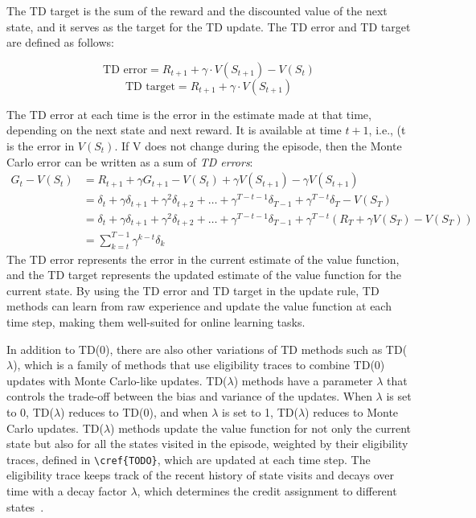 \documentclass[../xlapes02]{subfiles}
\begin{document}
    The TD target is the sum of the reward and the discounted value of the next state, and it serves as the target for the TD update. The TD error and TD target are defined as follows:

    \[ \text{TD error} = R_{t+1} + \gamma \cdot V(S_{t+1}) - V(S_t) \]
    \[ \text{TD target} = R_{t+1} + \gamma \cdot V(S_{t+1}) \]

%
    The TD error at each time is the error in the estimate made at that time, depending on the next state and next reward. It is available at time $t + 1$, i.e., (t is the error in $V(S_t)$. If V does not change during the episode, then the Monte Carlo error can be written as a sum of \emph{TD errors}:
    \begin{equation}
        \begin{split}
            G_t - V(S_t) &= R_{t+1} + \gamma G_{t+1} - V(S_t) + \gamma V (S_{t+1}) - \gamma V (S_{t+1})\\
            &= \delta_t + \gamma \delta_{t+1} + \gamma^2 \delta_{t+2} + \ldots + \gamma^{T-t-1} \delta_{T-1} + \gamma^{T-t} \delta_T - V(S_T)\\
            &= \delta_t + \gamma \delta_{t+1} + \gamma^2 \delta_{t+2} + \ldots + \gamma^{T-t-1} \delta_{T-1} + \gamma^{T-t} (R_T + \gamma V(S_T) - V(S_T))\\
            &= \sum_{k=t}^{T-1} \gamma^{k-t} \delta_k
        \end{split}
    \end{equation}
%
    The TD error represents the error in the current estimate of the value function, and the TD target represents the updated estimate of the value function for the current state. By using the TD error and TD target in the update rule, TD methods can learn from raw experience and update the value function at each time step, making them well-suited for online learning tasks.

    In addition to TD(0), there are also other variations of TD methods such as TD($\lambda$), which is a family of methods that use eligibility traces to combine TD(0) updates with Monte Carlo-like updates. TD($\lambda$) methods have a parameter $\lambda$ that controls the trade-off between the bias and variance of the updates. When $\lambda$ is set to 0, TD($\lambda$) reduces to TD(0), and when $\lambda$ is set to 1, TD($\lambda$) reduces to Monte Carlo updates. TD($\lambda$) methods update the value function for not only the current state but also for all the states visited in the episode, weighted by their eligibility traces, defined in \verb|\cref{TODO}|, which are updated at each time step. The eligibility trace keeps track of the recent history of state visits and decays over time with a decay factor $\lambda$, which determines the credit assignment to different states~\cite{sutton2018reinforcement}.
%
\end{document}
